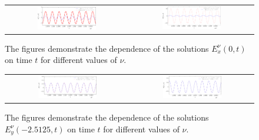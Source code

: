 \begin{figure}
\begin{tabular}{cc}
\includegraphics[width=0.5\textwidth]{res/ex_fixed_x-crop.pdf}&
\includegraphics[width=0.5\textwidth]{res/ex_fixed_x_1e3-crop.pdf}
\end{tabular}
\caption{The figures demonstrate the dependence of the solutions 
$E_x^{\nu}(0,t)$ on time $t$ for different values of $\nu$. }
\label{fig:resonance_nus_ex_x}
\end{figure}
\begin{figure}
\begin{tabular}{cc}
\includegraphics[width=0.5\textwidth]{res/ey_fixed_x-crop.pdf}&
\includegraphics[width=0.5\textwidth]{res/ey_fixed_x_1e3-crop.pdf}
 \end{tabular}
\caption{The figures demonstrate the dependence of the solutions 
$E_y^{\nu}(-2.5125,t)$ on time $t$ for different values of $\nu$. }
\label{fig:resonance_nus_ey_x}
\end{figure}


